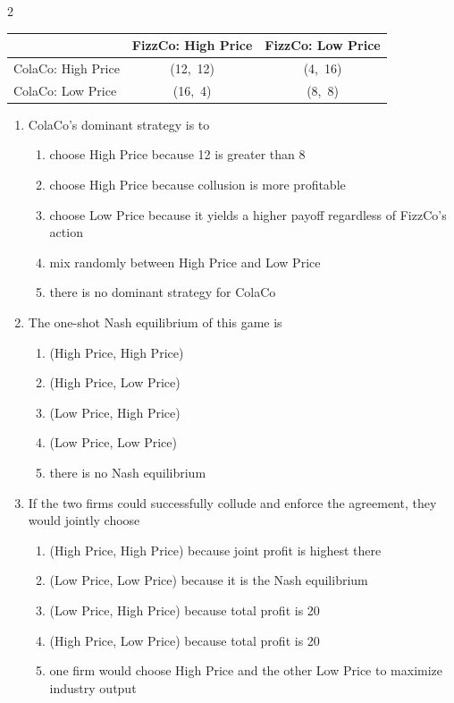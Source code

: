 \documentclass[10pt]{article}
\newenvironment{choiceslist}
  {\begin{enumerate}[label=(\Alph*), leftmargin=1.6em, itemsep=0.12em, topsep=0.18em, parsep=0pt]}
  {\end{enumerate}}
\newenvironment{stimulus}
  {\begin{center}\begin{minipage}{0.96\columnwidth}\footnotesize\itshape\setlength{\tabcolsep}{3pt}\renewcommand{\arraystretch}{0.96}}
  {\end{minipage}\end{center}}
\begin{document}
\begin{multicols*}{2}
\begin{stimulus}
\begin{center}
\begin{tabular}{lcc}
\toprule
& FizzCo: High Price & FizzCo: Low Price \\
\midrule
ColaCo: High Price & (12,\ 12) & (4,\ 16) \\
ColaCo: Low Price & (16,\ 4) & (8,\ 8) \\
\bottomrule
\end{tabular}
\end{center}
\end{stimulus}
\begin{enumerate}[resume*=apq, leftmargin=*, itemsep=0.85em, topsep=0.2em, parsep=0pt]
\item ColaCo's dominant strategy is to
\begin{choiceslist}
\item choose High Price because 12 is greater than 8
\item choose High Price because collusion is more profitable
\item choose Low Price because it yields a higher payoff regardless of FizzCo's action
\item mix randomly between High Price and Low Price
\item there is no dominant strategy for ColaCo
\end{choiceslist}
\item The one-shot Nash equilibrium of this game is
\begin{choiceslist}
\item (High Price, High Price)
\item (High Price, Low Price)
\item (Low Price, High Price)
\item (Low Price, Low Price)
\item there is no Nash equilibrium
\end{choiceslist}
\item If the two firms could successfully collude and enforce the agreement, they would jointly choose
\begin{choiceslist}
\item (High Price, High Price) because joint profit is highest there
\item (Low Price, Low Price) because it is the Nash equilibrium
\item (Low Price, High Price) because total profit is 20
\item (High Price, Low Price) because total profit is 20
\item one firm would choose High Price and the other Low Price to maximize industry output

\end{choiceslist}
\end{enumerate}
\end{multicols*}
\end{document}
